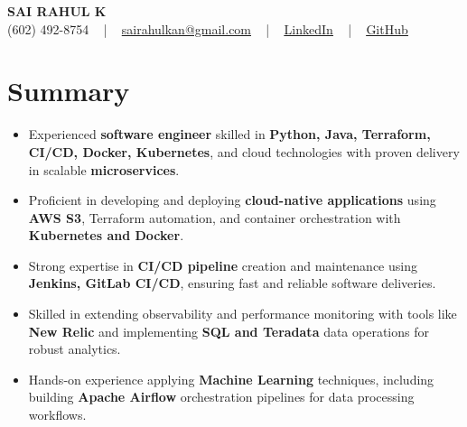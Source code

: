 \documentclass[letterpaper,11pt]{article}
\newcommand{\resumeItem}[1]{
  \item\footnotesize{
    {#1 \vspace{-2pt}}
  }
}
\newcommand{\resumeItemListStart}{\begin{itemize}[leftmargin=*]}
\newcommand{\resumeItemListEnd}{\end{itemize}\vspace{-5pt}}
\begin{document}
\begin{center}
    {\fontsize{14pt}{12pt}\selectfont \textbf{\MakeUppercase{Sai Rahul K}}}\\ \vspace{2pt}
    \fontsize{10pt}{12pt}\selectfont (602) 492-8754 ~ | ~ \href{mailto:sairahulkan@gmail.com}{sairahulkan@gmail.com} ~ | ~
    \href{https://www.linkedin.com/in/rq123/}{\color{blue}\underline{LinkedIn}} ~ | ~
    \href{https://github.com/kanrahuldo}{\color{blue}\underline{GitHub}}~
    \vspace{-8pt}
\end{center}

\section{Summary}
\fontsize{9pt}{10pt}\selectfont
\resumeItemListStart
    \resumeItem{Experienced \textbf{software engineer} skilled in \textbf{Python, Java, Terraform, CI/CD, Docker, Kubernetes}, and cloud technologies with proven delivery in scalable \textbf{microservices}.} \vspace{-3pt}
    \resumeItem{Proficient in developing and deploying \textbf{cloud-native applications} using \textbf{AWS S3}, Terraform automation, and container orchestration with \textbf{Kubernetes and Docker}.} \vspace{-3pt}
    \resumeItem{Strong expertise in \textbf{CI/CD pipeline} creation and maintenance using \textbf{Jenkins, GitLab CI/CD}, ensuring fast and reliable software deliveries.} \vspace{-3pt}
    \resumeItem{Skilled in extending observability and performance monitoring with tools like \textbf{New Relic} and implementing \textbf{SQL and Teradata} data operations for robust analytics.} \vspace{-3pt}
    \resumeItem{Hands-on experience applying \textbf{Machine Learning} techniques, including building \textbf{Apache Airflow} orchestration pipelines for data processing workflows.} \vspace{-3pt}
\resumeItemListEnd
\vspace{-6pt}
\end{document}
